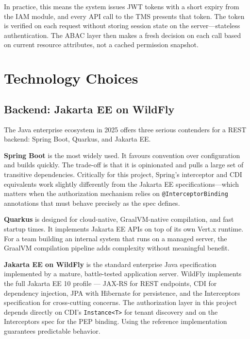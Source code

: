 In practice, this means the system issues JWT tokens with a short expiry from the IAM module, and every API call to the TMS presents that token. The token is verified on each request without storing session state on the server—stateless authentication. The ABAC layer then makes a fresh decision on each call based on current resource attributes, not a cached permission snapshot.

\section{Technology Choices}

\subsection{Backend: Jakarta EE on WildFly}

The Java enterprise ecosystem in 2025 offers three serious contenders for a REST backend: Spring Boot, Quarkus, and Jakarta EE.

\textbf{Spring Boot} is the most widely used. It favours convention over configuration and builds quickly. The trade-off is that it is opinionated and pulls a large set of transitive dependencies. Critically for this project, Spring's interceptor and CDI equivalents work slightly differently from the Jakarta EE specifications—which matters when the authorization mechanism relies on \texttt{@InterceptorBinding} annotations that must behave precisely as the spec defines.

\textbf{Quarkus} is designed for cloud-native, GraalVM-native compilation, and fast startup times. It implements Jakarta EE APIs on top of its own Vert.x runtime. For a team building an internal system that runs on a managed server, the GraalVM compilation pipeline adds complexity without meaningful benefit.

\textbf{Jakarta EE on WildFly} is the standard enterprise Java specification implemented by a mature, battle-tested application server. WildFly implements the full Jakarta EE 10 profile --- JAX-RS for REST endpoints, CDI for dependency injection, JPA with Hibernate for persistence, and the Interceptors specification for cross-cutting concerns. The authorization layer in this project depends directly on CDI's \texttt{Instance<T>} for tenant discovery and on the Interceptors spec for the PEP binding. Using the reference implementation guarantees predictable behavior.

